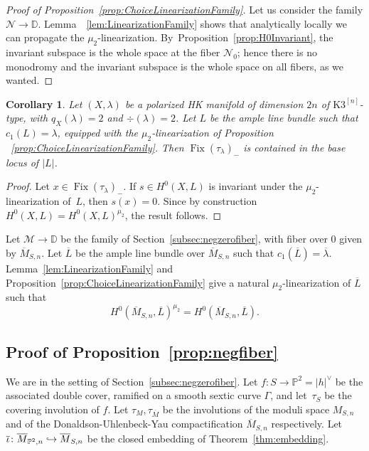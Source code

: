 \documentclass[JEP,XML,SOM,Unicode,published]{cedram}
\newcommand\hto{\mathrel{\lhook\joinrel\to}}
\newcommand{\HK}{\textup{HK}\xspace}
\newcommand{\DD}{{\mathbb D}}
\newcommand{\PP}{{\mathbb P}}\let\P\PP
\newcommand\cM{\mathcal{M}}
\DeclareMathOperator{\Fix}{Fix}
\let\hra\hto
\let\ov\overline
\newtheorem{coro}[lemm]{Corollary}
\theoremstyle{definition}
\begin{document}
\begin{proof}[Proof of Proposition~\ref{prop:ChoiceLinearizationFamily}]
Let us consider the family $\mathcal{N}\to\DD$.
Lemma~~\ref{lem:LinearizationFamily} shows that analytically locally we can propagate the $\mu_2$-linearization. By~Proposition~\ref{prop:H0Invariant}, the invariant subspace is the whole space at the fiber $\mathcal{N}_0$; hence there is no monodromy and the invariant subspace is the whole space on all fibers, as we wanted.
\end{proof}

\begin{coro}\label{coro:negbase}
Let $(X,\lambda)$ be a polarized \HK manifold of dimension $2n$ of $\mathrm{K3}^{[n]}$-type, with $q_X(\lambda)=2$ and $\div(\lambda)=2$.
Let $L$ be the ample line bundle such that $c_1(L)=\lambda$, equipped with the $\mu_2$-linearization of Proposition ~\ref{prop:ChoiceLinearizationFamily}.
Then $\Fix(\tau_{\lambda})_{-}$ is contained in the base locus of $|L|$.
\end{coro}

\begin{proof}
Let $x\in\Fix(\tau_{\lambda})_{-}$. If $s\in H^0(X,L)$ is invariant under the $\mu_2$-linearization of~$L$, then $s(x)=0$.
Since by construction $H^0(X,L)=H^0(X,L)^{\mu_2}$, the result follows.
\end{proof}

Let $\cM\to\DD$ be the family of Section~\ref{subsec:negzerofiber}, with fiber over $0$ given by $\overline{M}_{S,n}$. Let $\ov{L}$ be the ample line bundle over $\overline{M}_{S,n}$ such that $c_1(\ov{L})=\ov{\lambda}$.
Lemma~\ref{lem:LinearizationFamily} and Proposition~\ref{prop:ChoiceLinearizationFamily} give a natural $\mu_2$-linearization of $\ov{L}$ such that
\[
H^0(\overline{M}_{S,n},\ov{L})^{\mu_2} = H^0(\overline{M}_{S,n},\ov{L}).
\]

\subsection{Proof of Proposition~\ref{prop:negfiber}}\label{subsec:LinearizationDegree2}

We are in the setting of Section~\ref{subsec:negzerofiber}.
Let $f\colon S\to \P^2=|h|^{\vee}$ be the associated double cover, ramified on a smooth sextic curve $\mathsf{\Gamma}$, and let~$\tau_S$ be the covering involution of $f$.
Let $\tau_M,\tau_{\ov{M}}$ be the involutions of the moduli space $M_{S,n}$ and of the Donaldson-Uhlenbeck-Yau compactification $\ov{M}_{S,n}$ respectively. Let $\ov{\iota}\colon \ov{M}_{\PP^2,n}\hra \ov{M}_{S,n}$ be the closed embedding of Theorem~\ref{thm:embedding}.
\end{document}
